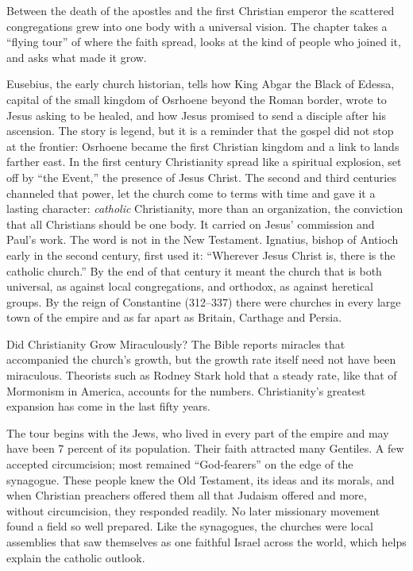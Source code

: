 
\begin{inbrief}
Between the death of the apostles and the first Christian emperor the scattered congregations grew
into one body with a universal vision. The chapter takes a ``flying tour'' of where the faith spread,
looks at the kind of people who joined it, and asks what made it grow.
\end{inbrief}

Eusebius, the early church historian, tells how King Abgar the Black of Edessa, capital of the small
kingdom of Osrhoene beyond the Roman border, wrote to Jesus asking to be healed, and how Jesus promised
to send a disciple after his ascension. The story is legend, but it is a reminder that the gospel did
not stop at the frontier: Osrhoene became the first Christian kingdom and a link to lands farther east. In the first century Christianity spread like a spiritual explosion, set off by ``the Event,'' the presence of Jesus
Christ. The second and third centuries channeled that power, let the church come to terms with time
and gave it a lasting character: \emph{catholic} Christianity, more than an organization, the
conviction that all Christians should be one body. It carried on Jesus' commission and Paul's work.
The word is not in the New Testament. Ignatius, bishop of Antioch early in the second century, first
used it: ``Wherever Jesus Christ is, there is the catholic church.'' By the end of that century it
meant the church that is both universal, as against local congregations, and orthodox, as against
heretical groups. By the reign of Constantine (312--337) there were churches in every large town of
the empire and as far apart as Britain, Carthage and Persia.

\begin{sidebox}{Did Christianity Grow Miraculously?}
The Bible reports miracles that accompanied the church's growth, but the growth rate itself need not
have been miraculous. Theorists such as Rodney Stark hold that a steady rate, like that of Mormonism in
America, accounts for the numbers. Christianity's greatest expansion has come in the last fifty years.
\end{sidebox}

The tour begins with the Jews, who lived in every part of the empire and may have been 7 percent of its
population. Their faith attracted many Gentiles. A few accepted circumcision; most remained
``God-fearers'' on the edge of the synagogue. These people knew the Old Testament, its ideas and its
morals, and when Christian preachers offered them all that Judaism offered and more, without
circumcision, they responded readily. No later missionary movement found a field so well prepared.
Like the synagogues, the churches were local assemblies that saw themselves as one faithful Israel
across the world, which helps explain the catholic outlook.

